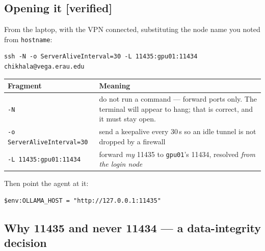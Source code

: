 \documentclass[11pt,a4paper]{article}
\newcommand{\verified}{{\color{good}\textbf{[verified]}}}
\begin{document}
\subsection{Opening it \verified}

From the laptop, with the VPN connected, substituting the node name you noted
from \texttt{hostname}:

\begin{lstlisting}
ssh -N -o ServerAliveInterval=30 -L 11435:gpu01:11434 chikhala@vega.erau.edu
\end{lstlisting}

\begin{center}
\begin{tabularx}{\linewidth}{@{}l X@{}}
\toprule
\textbf{Fragment} & \textbf{Meaning} \\
\midrule
\texttt{-N} & do not run a command --- forward ports only. The terminal will
appear to hang; that is correct, and it must stay open. \\
\texttt{-o ServerAliveInterval=30} & send a keepalive every 30\,s so an idle
tunnel is not dropped by a firewall \\
\texttt{-L 11435:gpu01:11434} & forward \emph{my} 11435 to \texttt{gpu01}'s
11434, resolved \emph{from the login node} \\
\bottomrule
\end{tabularx}
\end{center}

Then point the agent at it:

\begin{lstlisting}
$env:OLLAMA_HOST = "http://127.0.0.1:11435"
\end{lstlisting}

\subsection{Why 11435 and never 11434 --- a data-integrity decision}
\end{document}
